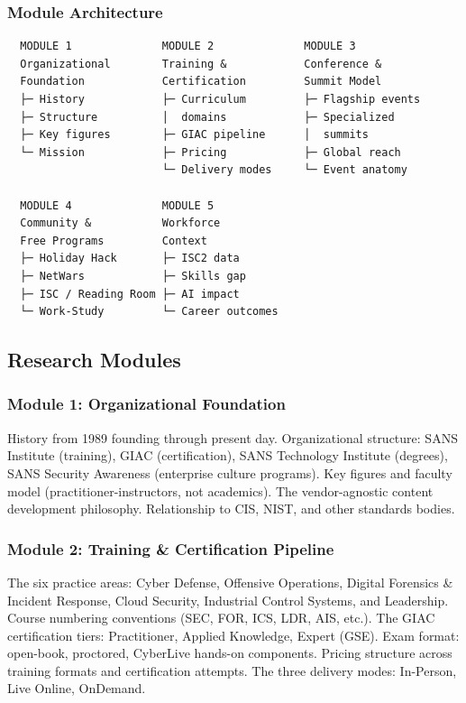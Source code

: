 \documentclass[11pt,letterpaper]{article}
\begin{document}
\subsubsection{Module Architecture}

\begin{asciibox}
\begin{verbatim}
  MODULE 1              MODULE 2              MODULE 3
  Organizational        Training &            Conference &
  Foundation            Certification         Summit Model
  ├─ History            ├─ Curriculum         ├─ Flagship events
  ├─ Structure          │  domains            ├─ Specialized
  ├─ Key figures        ├─ GIAC pipeline      │  summits
  └─ Mission            ├─ Pricing            ├─ Global reach
                        └─ Delivery modes     └─ Event anatomy

  MODULE 4              MODULE 5
  Community &           Workforce
  Free Programs         Context
  ├─ Holiday Hack       ├─ ISC2 data
  ├─ NetWars            ├─ Skills gap
  ├─ ISC / Reading Room ├─ AI impact
  └─ Work-Study         └─ Career outcomes
\end{verbatim}
\end{asciibox}

\subsection{Research Modules}

\subsubsection{Module 1: Organizational Foundation}
History from 1989 founding through present day. Organizational structure: SANS Institute (training), GIAC (certification), SANS Technology Institute (degrees), SANS Security Awareness (enterprise culture programs). Key figures and faculty model (practitioner-instructors, not academics). The vendor-agnostic content development philosophy. Relationship to CIS, NIST, and other standards bodies.

\subsubsection{Module 2: Training \& Certification Pipeline}
The six practice areas: Cyber Defense, Offensive Operations, Digital Forensics \& Incident Response, Cloud Security, Industrial Control Systems, and Leadership. Course numbering conventions (SEC, FOR, ICS, LDR, AIS, etc.). The GIAC certification tiers: Practitioner, Applied Knowledge, Expert (GSE). Exam format: open-book, proctored, CyberLive hands-on components. Pricing structure across training formats and certification attempts. The three delivery modes: In-Person, Live Online, OnDemand.
\end{document}
